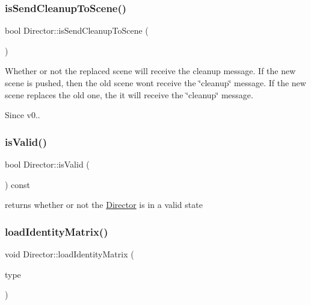 \subsubsection{\texorpdfstring{is\+Send\+Cleanup\+To\+Scene()}{isSendCleanupToScene()}\hspace{0.1cm}{\footnotesize\ttfamily [2/2]}}
{\footnotesize\ttfamily bool Director\+::is\+Send\+Cleanup\+To\+Scene (\begin{DoxyParamCaption}{ }\end{DoxyParamCaption})\hspace{0.3cm}{\ttfamily [inline]}}

Whether or not the replaced scene will receive the cleanup message. If the new scene is pushed, then the old scene won\textquotesingle{}t receive the \char`\"{}cleanup\char`\"{} message. If the new scene replaces the old one, the it will receive the \char`\"{}cleanup\char`\"{} message. \begin{DoxySince}{Since}
v0.. 
\end{DoxySince}
\mbox{\label{classDirector_ac302214e1e2f245e70d2e22905829fba}} 
\subsubsection{\texorpdfstring{is\+Valid()}{isValid()}}
{\footnotesize\ttfamily bool Director\+::is\+Valid (\begin{DoxyParamCaption}{ }\end{DoxyParamCaption}) const\hspace{0.3cm}{\ttfamily [inline]}}

returns whether or not the \hyperlink{classDirector}{Director} is in a valid state \mbox{\label{classDirector_a3491e578d2d80809b44892144bd6645a}} 
\subsubsection{\texorpdfstring{load\+Identity\+Matrix()}{loadIdentityMatrix()}\hspace{0.1cm}{\footnotesize\ttfamily [1/2]}}
{\footnotesize\ttfamily void Director\+::load\+Identity\+Matrix (\begin{DoxyParamCaption}\item[{\hyperlink{group__base_ga4d146cef7130a8f3a953d46964ea3905}{M\+A\+T\+R\+I\+X\+\_\+\+S\+T\+A\+C\+K\+\_\+\+T\+Y\+PE}}]{type }\end{DoxyParamCaption})}

